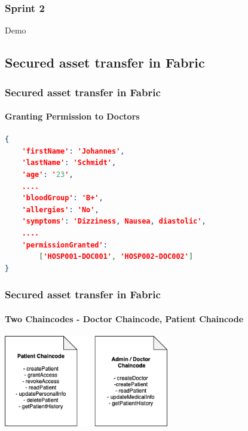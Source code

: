 \documentclass[english,hangout]{beamer}
\begin{document}
\begin{frame}[fragile]
 \frametitle{Sprint 2}
    \begin{center}
        \vspace{-1.2em}
            Demo
        \end{center}
\end{frame}


\subsection{Secured asset transfer in Fabric}

\begin{frame}[fragile]
    \frametitle{Secured asset transfer in Fabric}
    \framesubtitle{Granting Permission to Doctors}
    \begin{lstlisting}[language=json,firstnumber=1]
{
    'firstName': 'Johannes',
    'lastName': 'Schmidt',
    'age': '23',
    ....
    'bloodGroup': 'B+',
    'allergies': 'No',
    'symptoms': 'Dizziness, Nausea, diastolic',
    ....
    'permissionGranted': 
        ['HOSP001-DOC001', 'HOSP002-DOC002']
}    
    \end{lstlisting}
\end{frame}

\begin{frame}[fragile]
    \frametitle{Secured asset transfer in Fabric}
    \framesubtitle{Two Chaincodes - Doctor Chaincode, Patient Chaincode}
    \begin{center}
        \vspace{-1.2em}
            \includegraphics[height=4cm]{Smart-Contracts (1).png}
        \end{center}
        \vspace{-3mm}
\end{frame}
\end{document}
